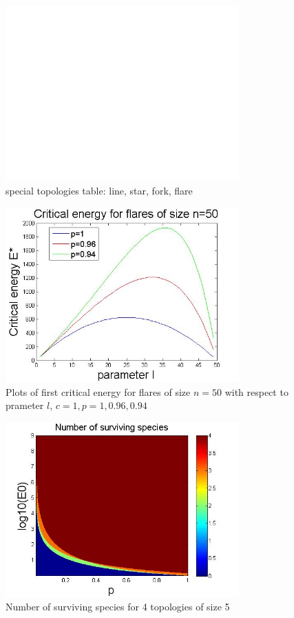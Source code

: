 \documentclass{amsart}
\theoremstyle{plain}
\numberwithin{equation}{section}
\begin{document}
\begin{figure}[p]
    \centering
    \includegraphics[width=0.8\textwidth]{untitled.jpg}
    \caption{special topologies table: line, star, fork, flare}
    \label{fig2}
\end{figure}

\begin{figure}[p]
    \centering
    \includegraphics[width=0.8\textwidth]{flares.jpg}
    \caption{Plots of first critical energy for flares of size $n=50$ with respect to prameter $l$, $c=1,p=1,0.96,0.94$}
    \label{fig3}
\end{figure}

\begin{figure}[p]
    \centering
    \includegraphics[width=0.8\textwidth]{4top5nodes.jpg}
    \caption{Number of surviving species for 4 topologies of size 5}
    \label{fig4}
\end{figure}
\end{document}
